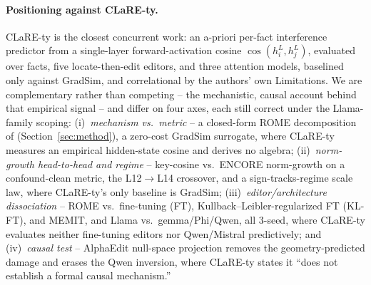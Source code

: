 \paragraph{Positioning against CLaRE-ty.} CLaRE-ty
\citep{clarety2026} is the closest concurrent work: an a-priori per-fact
interference predictor from a single-layer forward-activation cosine
$\cos(h_i^L,h_j^L)$, evaluated over \clareNfacts{} facts, five locate-then-edit
editors, and three attention models, baselined only against GradSim, and
correlational by the authors' own Limitations. We are complementary rather
than competing -- the mechanistic, causal account behind that empirical
signal -- and differ on four axes, each still correct under the Llama-family
scoping:
(i)~\emph{mechanism vs.\ metric} -- a closed-form ROME \SxC{} decomposition
of \dW{} (Section~\ref{sec:method}), a zero-cost GradSim surrogate, where
CLaRE-ty measures an empirical hidden-state cosine and derives no algebra;
(ii)~\emph{norm-growth head-to-head and regime} -- key-cosine vs.\ ENCORE
norm-growth on a confound-clean metric, the L12$\rightarrow$L14 crossover,
and a sign-tracks-regime scale law, where CLaRE-ty's only baseline is
GradSim; (iii)~\emph{editor\slash architecture dissociation} -- ROME vs.\
fine-tuning (FT), Kullback--Leibler-regularized FT (KL-FT), and MEMIT, and
Llama vs.\ gemma/Phi/Qwen, all 3-seed, where CLaRE-ty evaluates neither
fine-tuning editors nor Qwen/Mistral predictively; and
(iv)~\emph{causal test} -- AlphaEdit null-space projection removes the
geometry-predicted damage and erases the Qwen inversion, where CLaRE-ty
states it ``does not establish a formal causal mechanism.''

